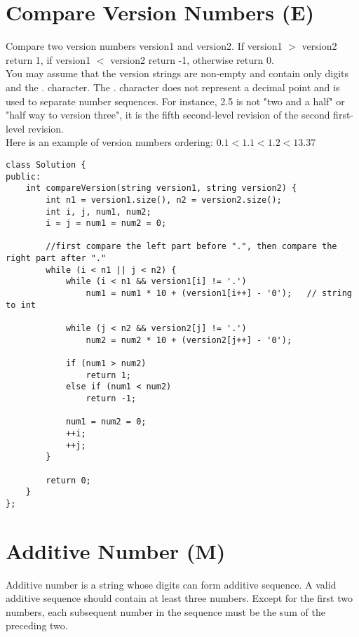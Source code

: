 \section{Compare Version Numbers (E)}
Compare two version numbers version1 and version2. If version1 $>$ version2 return 1, if version1 $<$ version2 return -1, otherwise return 0.\\

You may assume that the version strings are non-empty and contain only digits and the . character.
The . character does not represent a decimal point and is used to separate number sequences.
For instance, 2.5 is not "two and a half" or "half way to version three", it is the fifth second-level revision of the second first-level revision.\\

Here is an example of version numbers ordering: $0.1 < 1.1 < 1.2 < 13.37$\\

\begin{lstlisting}
class Solution {
public:
    int compareVersion(string version1, string version2) {
        int n1 = version1.size(), n2 = version2.size();
        int i, j, num1, num2;
        i = j = num1 = num2 = 0;
        
        //first compare the left part before ".", then compare the right part after "."
        while (i < n1 || j < n2) {
            while (i < n1 && version1[i] != '.')
                num1 = num1 * 10 + (version1[i++] - '0');   // string to int

            while (j < n2 && version2[j] != '.')
                num2 = num2 * 10 + (version2[j++] - '0');
            
            if (num1 > num2)
                return 1;
            else if (num1 < num2)
                return -1;
            
            num1 = num2 = 0;
            ++i;
            ++j;
        }
        
        return 0;
    }
};
\end{lstlisting}


\section{Additive Number (M)}
Additive number is a string whose digits can form additive sequence. A valid additive sequence should contain at least three numbers. Except for the first two numbers, each subsequent number in the sequence must be the sum of the preceding two.\\

